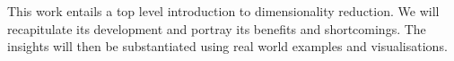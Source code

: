 
\begin{sciabstract}
This work entails a top level introduction to dimensionality reduction.
We will recapitulate its development and portray its benefits and shortcomings.
The insights will then be substantiated using real world examples and visualisations.
\end{sciabstract}

\clearpage
